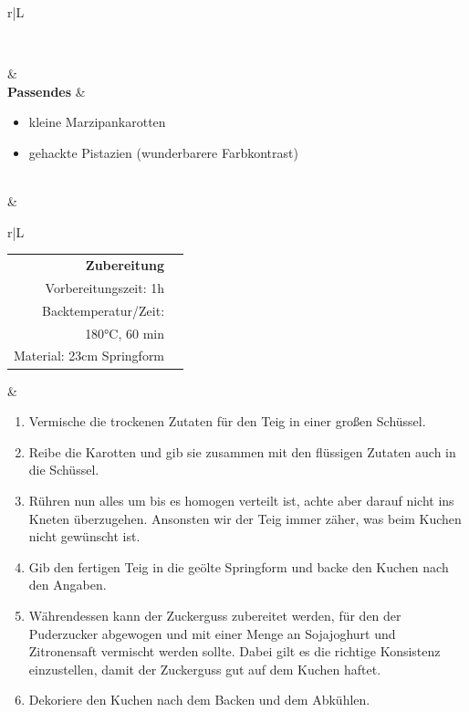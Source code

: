 \documentclass[a4paper, 12pt]{scrbook} 								%
\numberwithin{equation}{section} 									%
\begin{document}
\begin{tabularx}{\textwidth}{r|L}
\begin{tabular}[t]{llll}
										\end{tabular}	\\
									&	\\
			\textbf{Passendes}		&	\begin{itemize}[]
											\item kleine Marzipankarotten
											\item gehackte Pistazien (wunderbarere Farbkontrast)
										\end{itemize}	\\
									&	\\	
			\end{tabularx}
			\newpage
			\begin{tabularx}{\textwidth}{r|L}
		
		
			\begin{tabular}[t]{rr}
				\textbf{Zubereitung}	\\
				\small Vorbereitungszeit: 1h	\\
				\small Backtemperatur/Zeit: \\
				\small 180°C, 60 min \\
				\small Material: 23cm Springform \\
			\end{tabular}			&	\begin{enumerate}[]
											\item Vermische die trockenen Zutaten für den Teig in einer großen Schüssel.
											\item Reibe die Karotten und gib sie zusammen mit den flüssigen Zutaten auch in die Schüssel. 
											\item Rühren nun alles um bis es homogen verteilt ist, achte aber darauf nicht ins Kneten überzugehen. Ansonsten wir der Teig immer zäher, was beim Kuchen nicht gewünscht ist.
											\item Gib den fertigen Teig in die geölte Springform und backe den Kuchen nach den Angaben.
											\item Währendessen kann der Zuckerguss zubereitet werden, für den der Puderzucker abgewogen und mit einer Menge an Sojajoghurt und Zitronensaft vermischt werden sollte. Dabei gilt es die richtige Konsistenz einzustellen, damit der Zuckerguss gut auf dem Kuchen haftet.
											\item Dekoriere den Kuchen nach dem Backen und dem Abkühlen.
										\end{enumerate}	\\
		\end{tabularx}
		\newpage
		
\end{document}
